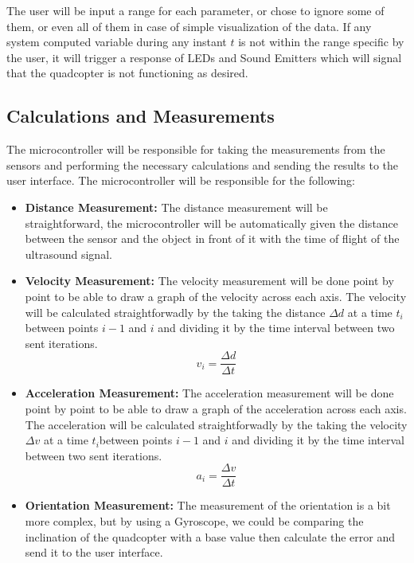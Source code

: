 \documentclass[12pt]{article}
\numberwithin{equation}{section}
\begin{document}
The user will be input a range for each parameter, or chose to ignore some of them, or even all of them in case of simple visualization of the data. If any system computed variable during any instant $t$ is not within the range specific by the user, it will trigger a response of LEDs and Sound Emitters which will signal that the quadcopter is not functioning as desired.

\subsection{Calculations and Measurements}
The microcontroller will be responsible for taking the measurements from the sensors and performing the necessary calculations and sending the results to the user interface. The microcontroller will be responsible for the following:

\begin{itemize}
  \item \textbf{Distance Measurement:} The distance measurement will be straightforward, the microcontroller will be automatically given the distance between the sensor and the object in front of it with the time of flight of the ultrasound signal.
  \item \textbf{Velocity Measurement:} The velocity measurement will be done point by point to be able to draw a graph of the velocity across each axis. The velocity will be calculated straightforwadly by the taking the distance $\Delta d$ at a time $t_i$ between points $i-1$ and $i$ and dividing it by the time interval between two sent iterations.
    \begin{equation}
      v_i = \frac{\Delta d}{\Delta t}
    \end{equation}  
  \item \textbf{Acceleration Measurement:} The acceleration measurement will be done point by point to be able to draw a graph of the acceleration across each axis. The acceleration will be calculated straightforwadly by the taking the velocity $\Delta v$ at a time $t_i$between points $i-1$ and $i$ and dividing it by the time interval between two sent iterations.
    \begin{equation}
      a_i = \frac{\Delta v}{\Delta t}
    \end{equation}
  \item \textbf{Orientation Measurement:} The measurement of the orientation is a bit more complex, but by using a Gyroscope, we could be comparing the inclination of the quadcopter with a base value then calculate the error and send it to the user interface.
\end{itemize}
\end{document}
